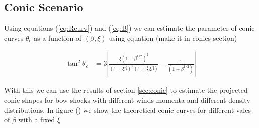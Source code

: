 \subsection{Conic Scenario}

Using equations (\ref{eq:Rcurv}) and (\ref{eq:B}) we can estimate the parameter of conic curves $\theta_c$ as a function of $(\beta,\xi)$ using equation (make it in conics section)

\begin{align}
\tan^2\theta_c &= 3\left| \frac{\xi\left(1+\beta^{1/2}\right)^2}{\left(1-\xi\beta\right)^2\left(1+\frac{1}{5}\xi\beta\right)}-\frac{1}{\left(1-\beta^{1/2}\right)}\right| 
\end{align}

With this we can use the results of section \ref{sec:conic} to estimate the projected conic shapes for bow shocks with different winds momenta and different density distributions. In figure () we show 
the theoretical conic curves for different vales of $\beta$ with a fixed $\xi$





